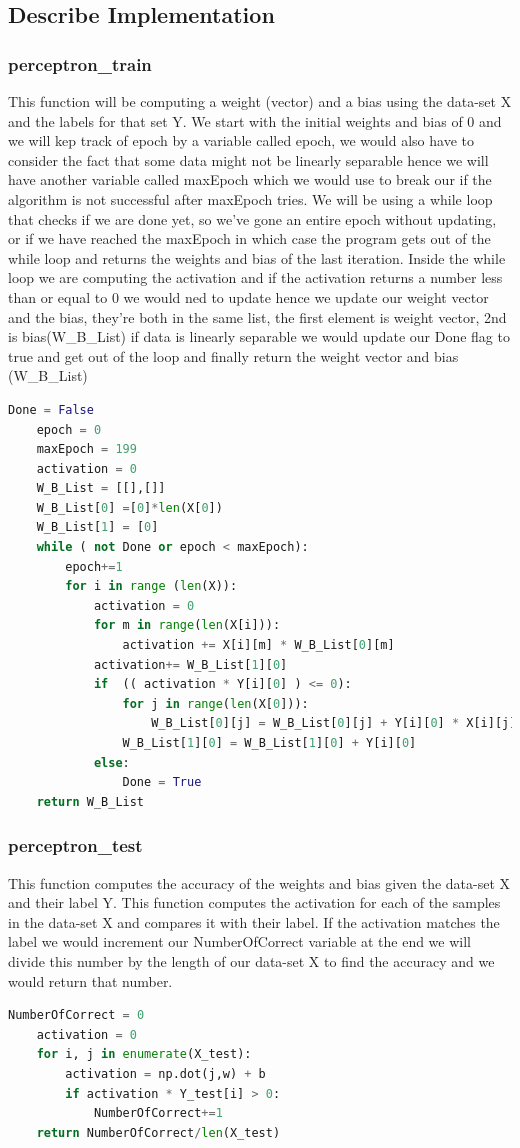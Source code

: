 \documentclass{article}
\begin{document}
	\subsection{Describe Implementation}
	\subsubsection{perceptron\_train}
	This function will be computing a weight (vector) and a bias using the data-set X and the labels for that set Y. We start with the initial weights and bias of 0 and we will kep track of epoch by a variable called epoch, we would also have to consider the fact that some data might not be linearly separable hence we will have another variable called maxEpoch which we would use to break our if the algorithm is not successful after maxEpoch tries. We will be using a while loop that checks if we are done yet, so we've gone an entire epoch without updating, or if we have reached the maxEpoch in which case the program gets out of the while loop and returns the weights and bias of the last iteration. Inside the while loop we are computing the activation and if the activation returns a number less than or equal to 0 we would ned to update hence we update our weight vector and the bias, they're both in the same list, the first element is weight vector, 2nd is bias(W\_B\_List) if data is linearly separable we would update our Done flag to true and get out of the loop and finally return the weight vector and bias (W\_B\_List)
	\begin{lstlisting}[language=Python]
	Done = False
	epoch = 0
	maxEpoch = 199
	activation = 0
	W_B_List = [[],[]]
	W_B_List[0] =[0]*len(X[0])
	W_B_List[1] = [0]
	while ( not Done or epoch < maxEpoch):
		epoch+=1
		for i in range (len(X)):
			activation = 0
			for m in range(len(X[i])):
				activation += X[i][m] * W_B_List[0][m]
			activation+= W_B_List[1][0]
			if  (( activation * Y[i][0] ) <= 0):
				for j in range(len(X[0])):
					W_B_List[0][j] = W_B_List[0][j] + Y[i][0] * X[i][j]
				W_B_List[1][0] = W_B_List[1][0] + Y[i][0]
			else:
				Done = True
	return W_B_List
	\end{lstlisting}

	\subsubsection{perceptron\_test}
	This function computes the accuracy of the weights and bias given the data-set X and their label Y. This function computes the activation for each of the samples in the data-set X and compares it with their label. If the activation matches the label we would increment our NumberOfCorrect variable at the end we will divide this number by the length of our data-set X to find the accuracy and we would return that number.
	\begin{lstlisting}[language=Python]
	NumberOfCorrect = 0
	activation = 0
	for i, j in enumerate(X_test):
		activation = np.dot(j,w) + b
		if activation * Y_test[i] > 0:
			NumberOfCorrect+=1
	return NumberOfCorrect/len(X_test)
	\end{lstlisting}
\end{document}
